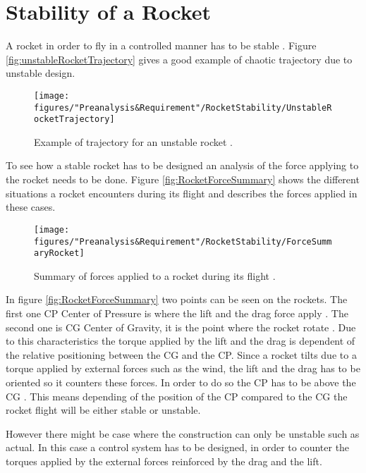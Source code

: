 \section{Stability of a Rocket}

A rocket in order to fly in a controlled manner has to be stable \cite{web:rocketnasa}. Figure \vref{fig:unstableRocketTrajectory} gives a good example of chaotic trajectory due to unstable design.

\begin{figure} [htbp]
	\centering
	\texttt{[image: figures/"Preanalysis\&Requirement"/RocketStability/UnstableRocketTrajectory]}
	\caption{Example of trajectory for an unstable rocket \cite{web:rocketnasa}.}
	\label{fig:unstableRocketTrajectory}
\end{figure}

To see how a stable rocket has to be designed an analysis of the force applying to the rocket needs to be done. Figure \vref{fig:RocketForceSummary} shows the different situations a rocket encounters during its flight and describes the forces applied in these cases.

\begin{figure} [htbp]
	\centering
	\texttt{[image: figures/"Preanalysis\&Requirement"/RocketStability/ForceSummaryRocket]}
	\caption{Summary of forces applied to a rocket during its flight \cite{web:rocketnasa}.}
	\label{fig:RocketForceSummary}
\end{figure}

In figure \vref{fig:RocketForceSummary} two points can be seen on the rockets. The first one CP Center of Pressure is where the  lift and the drag force apply \cite{web:rocketnasa}. The second one is CG Center of Gravity, it is the point where the rocket rotate \cite{web:rocketnasa}. Due to this characteristics the torque applied by the lift and the drag is dependent of the relative positioning between the CG and the CP. Since a rocket tilts due to a torque applied by external forces such as the wind, the lift and the drag has to be oriented so it counters these forces. In order to do so the CP has to be above the CG \cite{web:rocketnasa}.
This means depending of the position of the CP compared to the CG the rocket flight will be either stable or unstable.

However there might be case where the construction can only be unstable such as actual. In this case a control system has to be designed, in order to counter the torques applied by the external forces reinforced by the drag and the lift.